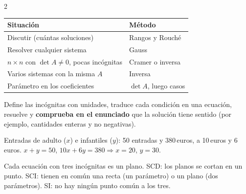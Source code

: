 \documentclass[10pt]{article}
\begin{document}
\begin{multicols}{2}
\begin{tabular}{@{}p{3.6cm}p{4.2cm}@{}}
\textbf{Situación} & \textbf{Método}\\ \hline
Discutir (cuántas soluciones) & Rangos y Rouché\\
Resolver cualquier sistema & Gauss\\
\(n\times n\) con \(\det A\ne0\), pocas incógnitas & Cramer o inversa\\
Varios sistemas con la misma \(A\) & Inversa\\
Parámetro en los coeficientes & \(\det A\), luego casos
\end{tabular}

Define las incógnitas con unidades, traduce cada condición en una ecuación, resuelve y \textbf{comprueba en el enunciado} que la solución tiene sentido (por ejemplo, cantidades enteras y no negativas).
\begin{ejemplo}
Entradas de adulto (\(x\)) e infantiles (\(y\)): 50 entradas y 380\,euros, a 10\,euros y 6\,euros.
\(x+y=50\), \(10x+6y=380\Rightarrow x=20\), \(y=30\).
\end{ejemplo}

Cada ecuación con tres incógnitas es un plano. SCD: los planos se cortan en un punto. SCI: tienen en común una recta (un parámetro) o un plano (dos parámetros). SI: no hay ningún punto común a los tres.


\end{multicols}
\end{document}
